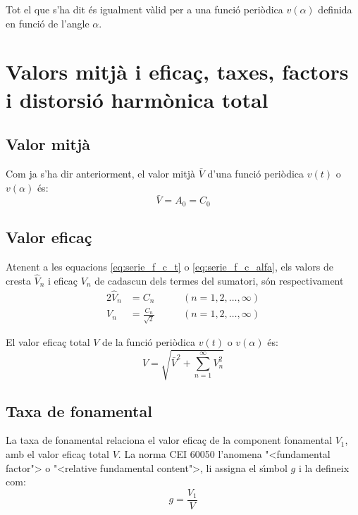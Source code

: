 Tot el que s'ha dit \'{e}s igualment v\`{a}lid per a una funci\'{o} peri\`{o}dica
$v(\alpha)$  definida en funci\'{o} de l'angle $\alpha$.


\section{Valors mitj\`{a} i efica\c{c}, taxes, factors i distorsi\'{o} harm\`{o}nica total}\label{sec:four_val_mitja_ef}

\subsection{Valor mitj\`{a}}\label{sec:four_val_av}

Com ja s'ha dir anteriorment, el valor mitj\`{a} $\bar{V}$ d'una
funci\'{o} peri\`{o}dica $v(t)$ o $v(\alpha)$ \'{e}s:
\begin{equation}
    \bar{V} = A_0 = C_0
\end{equation}

\subsection{Valor efica\c{c}}\label{sec:four_val_ef}

Atenent a les equacions  \eqref{eq:serie_f_c_t} o
\eqref{eq:serie_f_c_alfa}, els valors de cresta $\hat{V}_n$ i efica\c{c}
$V_n$ de cadascun dels termes del sumatori, s\'{o}n respectivament
\begin{alignat}{2}
    \hat{V}_n &= C_n &\qquad(n=1,2,\ldots,\infty)\\[0.5ex]
    V_n &= \frac{C_n}{\sqrt{2}} &\qquad(n=1,2,\ldots,\infty)
\end{alignat}

El valor efica\c{c} total $V$ de  la funci\'{o} peri\`{o}dica $v(t)$ o
$v(\alpha)$ \'{e}s:
\begin{equation}
    V = \sqrt{\bar{V}^2 + \sum_{n=1}^{\infty}V^2_n} \label{eq:val_ef_fourier}
\end{equation}

\subsection{Taxa de fonamental}
La taxa  de fonamental relaciona el valor efica\c{c} de la component fonamental $V_1$, amb el valor efica\c{c}
total $V$. La norma \textsf{CEI 60050} l'anomena {"<}fundamental factor{">} o {"<}relative fundamental content{">}, li assigna el s\'{\i}mbol $g$ i la defineix com:
\begin{equation}
    g = \frac{V_1}{V}
\end{equation}

